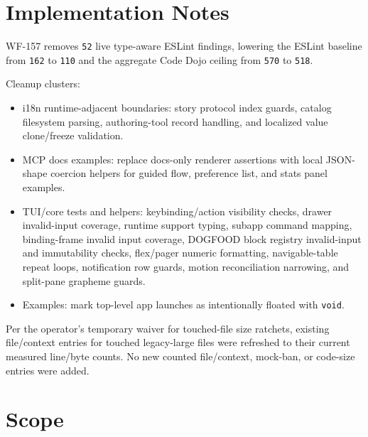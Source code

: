\section{Implementation Notes}\label{record-239-implementation-notes}

WF-157 removes \texttt{5\allowbreak{}2} live type-aware ESLint findings, lowering the ESLint baseline from \texttt{1\allowbreak{}6\allowbreak{}2} to \texttt{1\allowbreak{}1\allowbreak{}0} and the aggregate Code Dojo ceiling from \texttt{5\allowbreak{}7\allowbreak{}0} to \texttt{5\allowbreak{}1\allowbreak{}8}.

Cleanup clusters:

\begin{itemize}
\tightlist
\item
  i18n runtime-adjacent boundaries: story protocol index guards, catalog filesystem parsing, authoring-tool record handling, and localized value clone/freeze validation.
\item
  MCP docs examples: replace docs-only renderer assertions with local JSON-shape coercion helpers for guided flow, preference list, and stats panel examples.
\item
  TUI/core tests and helpers: keybinding/action visibility checks, drawer invalid-input coverage, runtime support typing, subapp command mapping, binding-frame invalid input coverage, DOGFOOD block registry invalid-input and immutability checks, flex/pager numeric formatting, navigable-table repeat loops, notification row guards, motion reconciliation narrowing, and split-pane grapheme guards.
\item
  Examples: mark top-level app launches as intentionally floated with \texttt{v\allowbreak{}o\allowbreak{}i\allowbreak{}d}.
\end{itemize}

Per the operator's temporary waiver for touched-file size ratchets, existing file/context entries for touched legacy-large files were refreshed to their current measured line/byte counts. No new counted file/context, mock-ban, or code-size entries were added.

\section{Scope}\label{record-239-scope}

